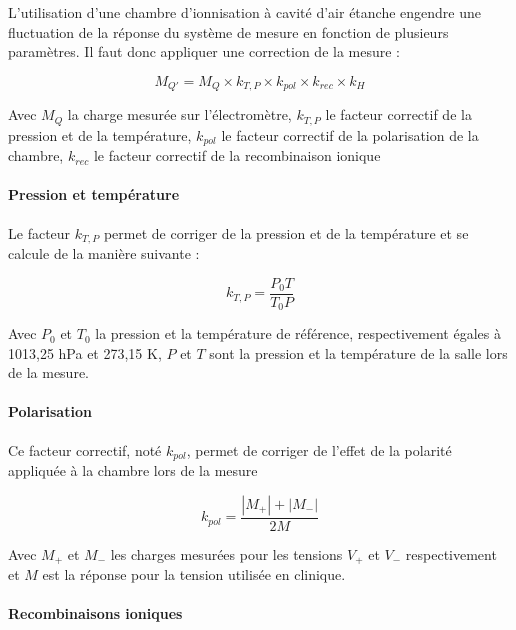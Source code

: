 \documentclass{article}
\begin{document}
L'utilisation d'une chambre d'ionnisation à cavité d'air étanche engendre une fluctuation de la réponse du système de mesure en fonction de plusieurs paramètres. Il faut donc appliquer une correction de la mesure :

\begin{equation}
  M_{Q'} = M_Q \times k_{T,P} \times k_{pol} \times k_{rec} \times k_H
  \label{eq_corr_charge}
\end{equation}

Avec $M_Q$ la charge mesurée sur l'électromètre, $k_{T,P}$ le facteur correctif de la pression et de la température, $k_{pol}$ le facteur correctif de la polarisation de la chambre, $k_{rec}$ le facteur correctif de la recombinaison ionique 

\paragraph{Pression et température}

Le facteur $k_{T,P}$ permet de corriger de la pression et de la température et se calcule de la manière suivante :

\begin{equation}
  k_{T,P} = \dfrac{P_0T}{T_0P}
  \label{eq_k_TP}
\end{equation}

Avec $P_0$ et $T_0$ la pression et la température de référence, respectivement égales à 1013,25 hPa et 273,15 K, $P$ et $T$ sont la pression et la température de la salle lors de la mesure.

\paragraph{Polarisation}

Ce facteur correctif, noté $k_{pol}$, permet de corriger de l'effet de la polarité appliquée à la chambre lors de la mesure

\begin{equation}
  k_{pol} = \dfrac{|M_+| + |M_-|}{2M}
  \label{eq_pol}
\end{equation}

Avec $M_+$ et $M_-$ les charges mesurées pour les tensions $V_+$ et $V_-$ respectivement et $M$ est la réponse pour la tension utilisée en clinique.

\paragraph{Recombinaisons ioniques}
\end{document}
